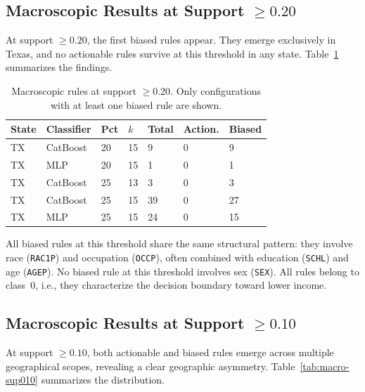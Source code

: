 \subsection{Macroscopic Results at Support \texorpdfstring{$\geq 0.20$}{>= 0.20}}

At support $\geq 0.20$, the first biased rules appear. They emerge exclusively in Texas, and no actionable rules survive at this threshold in any state. Table~\ref{tab:macro-sup020} summarizes the findings.

\begin{table}[htbp]
\centering
\renewcommand{\arraystretch}{1.2}
\caption{Macroscopic rules at support $\geq 0.20$. Only configurations with at least one biased rule are shown.}
\label{tab:macro-sup020}
\begin{tabular}{>{\raggedright\arraybackslash}p{} >{\raggedright\arraybackslash}p{} p{} p{} p{} p{} p{}}
  \toprule
  \textbf{State} & \textbf{Classifier} & \textbf{Pct} & \textbf{$k$} & \textbf{Total} & \textbf{Action.} & \textbf{Biased} \\
  \midrule
  TX & CatBoost & 20 & 15 & 9 & 0 & 9 \\
  TX & MLP & 20 & 15 & 1 & 0 & 1 \\
  TX & CatBoost & 25 & 13 & 3 & 0 & 3 \\
  TX & CatBoost & 25 & 15 & 39 & 0 & 27 \\
  TX & MLP & 25 & 15 & 24 & 0 & 15 \\
  \bottomrule
\end{tabular}
\renewcommand{\arraystretch}{1.0}
\end{table}

All biased rules at this threshold share the same structural pattern: they involve race (\texttt{RAC1P}) and occupation (\texttt{OCCP}), often combined with education (\texttt{SCHL}) and age (\texttt{AGEP}). No biased rule at this threshold involves sex (\texttt{SEX}). All rules belong to class~0, i.e., they characterize the decision boundary toward lower income.

\subsection{Macroscopic Results at Support \texorpdfstring{$\geq 0.10$}{>= 0.10}}

At support $\geq 0.10$, both actionable and biased rules emerge across multiple geographical scopes, revealing a clear geographic asymmetry. Table~\ref{tab:macro-sup010} summarizes the distribution.

